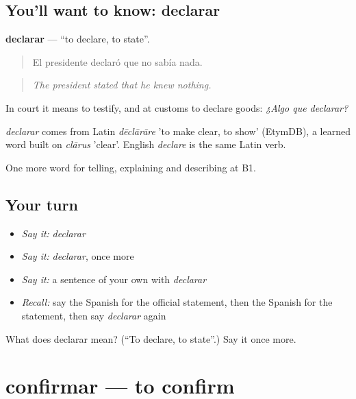 \subsection*{You'll want to know: declarar}
\textbf{declarar} — \textquotedblleft{}to declare, to state\textquotedblright{}.

\begin{quote}
El presidente declaró que no sabía nada.
\end{quote}

\begin{quote}
\emph{The president stated that he knew nothing.}
\end{quote}

In court it means to testify, and at customs to declare goods: \emph{¿Algo que declarar?}

\begin{cousinweb}
\emph{declarar} comes from Latin \emph{dēclārāre} 'to make clear, to show' (EtymDB), a learned word built on \emph{clārus} 'clear'. English \emph{declare} is the same Latin verb.
\end{cousinweb}

\begin{grammarlens}[title={What you've built}]
One more word for telling, explaining and describing at B1.
\end{grammarlens}

\subsection*{Your turn}
\begin{itemize}
\raggedright
  \item \emph{Say it:} \emph{declarar}
  \item \emph{Say it:} \emph{declarar}, once more
  \item \emph{Say it:} a sentence of your own with \emph{declarar}
  \item \emph{Recall:} say the Spanish for the official statement, then the Spanish for the statement, then say \emph{declarar} again
\end{itemize}

\begin{tcolorbox}[breakable,colback=teal!4,colframe=teal!35!black,title={Before you move on}]
What does declarar mean? (\textquotedblleft{}To declare, to state\textquotedblright{}.) Say it once more.
\end{tcolorbox}
\section[confirmar]{confirmar — to confirm}


